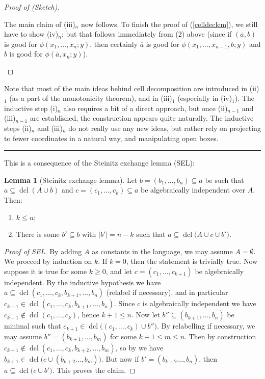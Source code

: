 \documentclass[a4paper]{report}
\newcommand{\ind}{\hspace{15pt}}
\renewcommand{\a}{\overline{a}}
\DeclareMathOperator{\dcl}{dcl}
\theoremstyle{definition}
\newtheorem*{lem*}{Lemma}
\theoremstyle{remstyle}
\begin{document}
\begin{proof}[Proof of  (Sketch)]
\begin{itemize}[leftmargin=*,itemsep=12pt]
\begin{enumerate}[itemsep=12pt,label=(\roman*)$_n$]
			            The main claim of (iii)$_n$ now follows. To finish the proof of (\ref{celldeclem}), we still have to show (iv)$_n$; but that follows immediately from (2) above (since if $(\a,b)$ is good for $\phi(x_1,\ldots,x_n;y)$, then certainly $\a$ is good for $\phi(x_1,\ldots,x_{n-1},b;y)$ and $b$ is good for $\phi(\a,x_n;y)$).
		      \end{enumerate}
	\end{itemize}
\end{proof}

\ind Note that most of the main ideas behind cell decomposition are introduced in (ii)$_1$ (as a part of the monotonicity theorem), and in (iii)$_1$ (especially in (iv)$_1$). The inductive step (i)$_n$ also requires a bit of a direct approach, but once (ii)$_{n-1}$ and (iii)$_{n-1}$ are established, the construction appears quite naturally. The inductive steps (ii)$_{n}$ and (iii)$_n$ do not really use any new ideas, but rather rely on projecting to fewer coordinates in a natural way, and manipulating open boxes.

\par\noindent\rule{\textwidth}{0.4pt}

\dimlem*

\ind This is a consequence of the Steinitz exchange lemma (SEL):

\begin{lem*}[Steinitz exchange lemma]
	Let $b=(b_1,\ldots,b_n)\subseteq a$ be such that $a\subseteq\dcl(A\cup b)$ and $c=(c_1,\ldots,c_k)\subseteq a$ be algebraically independent over $A$. Then:
	\begin{enumerate}
		\item $k\leq n$;
		\item There is some $b'\subseteq b$ with $|b'|= n-k$ such that $a\subseteq\dcl\big(A\cup c\cup b'\big)$.
	\end{enumerate}
\end{lem*}

\begin{proof}[Proof of SEL]
	By adding $A$ as constants in the language, we may assume $A=\emptyset$. We proceed by induction on $k$. If $k=0$, then the statement is trivially true. Now suppose it is true for some $k\geq 0$, and let $c=(c_1,\ldots,c_{k+1})$ be algebraically independent. By the inductive hypothesis we have $a\subseteq \dcl(c_1,\ldots,c_k,b_{k+1},\ldots,b_n)$ (relabel if necessary), and in particular $c_{k+1}\in\dcl(c_1,\ldots,c_k,b_{k+1},\ldots,b_n)$. Since $c$ is algebraically independent we have $c_{k+1} \not\in \dcl(c_1,\ldots,c_k)$, hence $k+1\leq n$. Now let $b''\subseteq(b_{k+1},\ldots,b_n)$ be minimal such that $c_{k+1}\in \dcl\big((c_1,\ldots,c_k)\cup b''\big)$. By relabelling if necessary, we may assume $b''=(b_{k+1},\ldots,b_m)$ for some $k+1\leq m\leq n$. Then by construction $c_{k+1}\not\in\dcl(c_1,\ldots,c_k,b_{k+2},\ldots,b_m)$, so by  we have $b_{k+1}\in\dcl\big(c\cup (b_{k+2}\ldots,b_m)\big)$. But now if $b'=(b_{k+2}\ldots,b_n)$, then $a\subseteq\dcl\big(c\cup b'\big)$. This proves the claim.
\end{proof}
\end{document}
